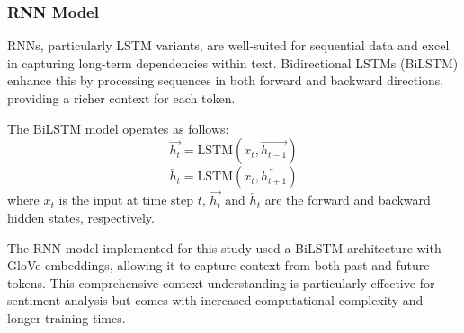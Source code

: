 \documentclass[12pt]{article}
\begin{document}
\subsubsection{RNN Model}
RNNs, particularly LSTM variants, are well-suited for sequential data and excel in capturing long-term dependencies within text. Bidirectional LSTMs (BiLSTM) enhance this by processing sequences in both forward and backward directions, providing a richer context for each token.

The BiLSTM model operates as follows:
\begin{equation}
\overrightarrow{h_t} = \text{LSTM}(x_t, \overrightarrow{h_{t-1}})
\end{equation}
\begin{equation}
\overleftarrow{h_t} = \text{LSTM}(x_t, \overleftarrow{h_{t+1}})
\end{equation}
where \( x_t \) is the input at time step \( t \), \( \overrightarrow{h_t} \) and \( \overleftarrow{h_t} \) are the forward and backward hidden states, respectively.

The RNN model implemented for this study used a BiLSTM architecture with GloVe embeddings, allowing it to capture context from both past and future tokens. This comprehensive context understanding is particularly effective for sentiment analysis but comes with increased computational complexity and longer training times.
\end{document}
